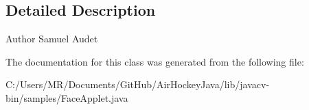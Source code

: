 \subsection{Detailed Description}
\begin{DoxyAuthor}{Author}
Samuel Audet 
\end{DoxyAuthor}


The documentation for this class was generated from the following file\+:\begin{DoxyCompactItemize}
\item 
C\+:/\+Users/\+M\+R/\+Documents/\+Git\+Hub/\+Air\+Hockey\+Java/lib/javacv-\/bin/samples/Face\+Applet.\+java\end{DoxyCompactItemize}
